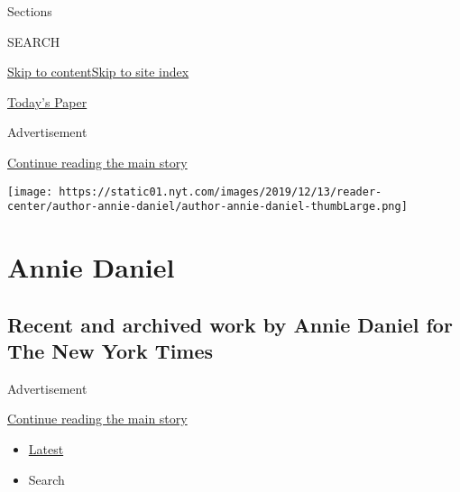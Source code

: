 Sections

SEARCH

\protect\hyperlink{site-content}{Skip to
content}\protect\hyperlink{site-index}{Skip to site index}

\href{https://myaccount.nytimes.com/auth/login?response_type=cookie\&client_id=vi}{}

\href{https://www.nytimes.com/section/todayspaper}{Today's Paper}

Advertisement

\protect\hyperlink{after-top}{Continue reading the main story}

\texttt{[image: https://static01.nyt.com/images/2019/12/13/reader-center/author-annie-daniel/author-annie-daniel-thumbLarge.png]}

\hypertarget{annie-daniel}{%
\section{Annie Daniel}\label{annie-daniel}}

\hypertarget{recent-and-archived-work-by-annie-daniel-for-the-new-york-times}{%
\subsection{Recent and archived work by Annie Daniel for The New York
Times}\label{recent-and-archived-work-by-annie-daniel-for-the-new-york-times}}

Advertisement

\protect\hyperlink{after-mid1}{Continue reading the main story}

\begin{itemize}
\tightlist
\item
  \protect\hyperlink{stream-panel}{Latest}
\item
  Search
\end{itemize}

